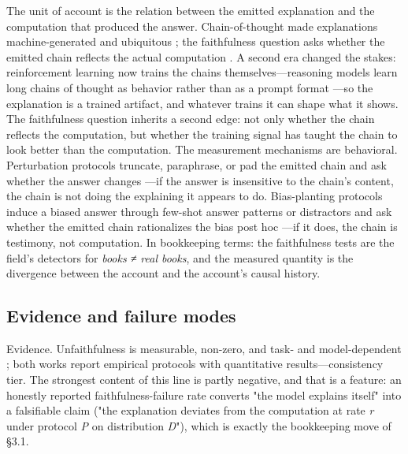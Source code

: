 \documentclass[11pt,a4paper]{article}
\begin{document}
The unit of account is the relation between the emitted explanation and the computation that produced the answer. Chain-of-thought made explanations machine-generated and ubiquitous \cite{key01}; the faithfulness question asks whether the emitted chain reflects the actual computation \cite{key02,key03}. A second era changed the stakes: reinforcement learning now trains the chains themselves—reasoning models learn long chains of thought as behavior rather than as a prompt format \cite{key26}—so the explanation is a trained artifact, and whatever trains it can shape what it shows. The faithfulness question inherits a second edge: not only whether the chain reflects the computation, but whether the training signal has taught the chain to look better than the computation. The measurement mechanisms are behavioral. Perturbation protocols truncate, paraphrase, or pad the emitted chain and ask whether the answer changes \cite{key03}—if the answer is insensitive to the chain's content, the chain is not doing the explaining it appears to do. Bias-planting protocols induce a biased answer through few-shot answer patterns or distractors and ask whether the emitted chain rationalizes the bias post hoc \cite{key02}—if it does, the chain is testimony, not computation. In bookkeeping terms: the faithfulness tests are the field's detectors for \textit{books ≠ real books}, and the measured quantity is the divergence between the account and the account's causal history.

\subsection{Evidence and failure modes}

Evidence. Unfaithfulness is measurable, non-zero, and task- and model-dependent \cite{key02,key03}; both works report empirical protocols with quantitative results—consistency tier. The strongest content of this line is partly negative, and that is a feature: an honestly reported faithfulness-failure rate converts "the model explains itself" into a falsifiable claim ("the explanation deviates from the computation at rate \textit{r} under protocol \textit{P} on distribution \textit{D}"), which is exactly the bookkeeping move of §3.1.
\end{document}
